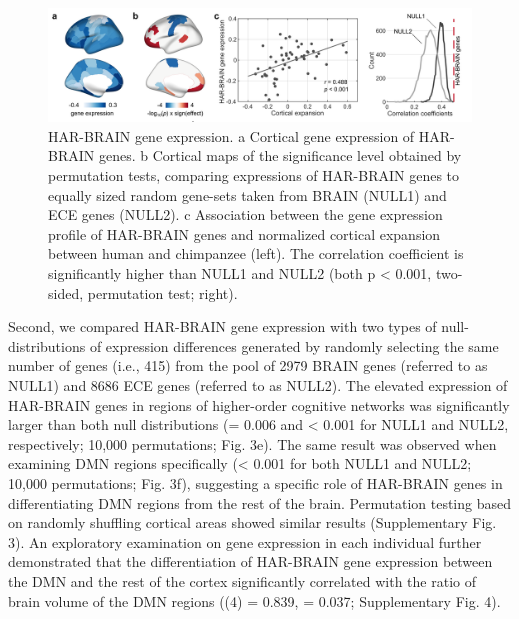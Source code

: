 \begin{refsection}
\begin{figure}[h]
    \centering
    \includegraphics[width=\linewidth]{images/harFig3.png}
    \caption{HAR-BRAIN gene expression. a Cortical gene expression of HAR-BRAIN genes. b Cortical maps of the significance level obtained by permutation tests, comparing expressions of HAR-BRAIN genes to equally sized random gene-sets taken from BRAIN (NULL1) and ECE genes (NULL2). c Association between the gene expression profile of HAR-BRAIN genes and normalized cortical expansion between human and chimpanzee (left). The correlation coefficient is significantly higher than NULL1 and NULL2 (both p < 0.001, two-sided, permutation test; right).}
    \label{harFig3}
\end{figure}

Second, we compared HAR-BRAIN gene expression with two types of null-distributions of expression differences generated by randomly selecting the same number of genes (i.e., 415) from the pool of 2979 BRAIN genes (referred to as NULL1) and 8686 ECE genes (referred to as NULL2). The elevated expression of HAR-BRAIN genes in regions of higher-order cognitive networks was significantly larger than both null distributions (\pval = 0.006 and \pval < 0.001 for NULL1 and NULL2, respectively; 10,000 permutations; Fig. 3e). The same result was observed when examining DMN regions specifically (\pval < 0.001 for both NULL1 and NULL2; 10,000 permutations; Fig. 3f), suggesting a specific role of HAR-BRAIN genes in differentiating DMN regions from the rest of the brain. Permutation testing based on randomly shuffling cortical areas showed similar results (Supplementary Fig. 3). An exploratory examination on gene expression in each individual further demonstrated that the differentiation of HAR-BRAIN gene expression between the DMN and the rest of the cortex significantly correlated with the ratio of brain volume of the DMN regions (\rvaldf(4) = 0.839, \pval = 0.037; Supplementary Fig. 4).


\end{refsection}
